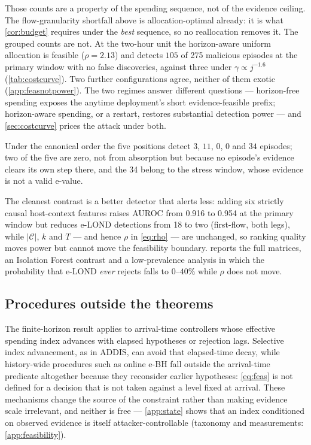 \documentclass[conference]{IEEEtran}
\newcommand{\Cal}{\mathcal{C}}
\newcommand{\nCal}{\lvert\Cal\rvert}
\begin{document}
Those counts are a property of the spending sequence, not of the evidence ceiling. The flow-granularity shortfall above is allocation-optimal already: it is what
\cref{cor:budget} requires under the \emph{best} sequence, so no reallocation removes it. The grouped
counts are not. At the two-hour unit the horizon-aware uniform allocation is feasible ($\rho=2.13$) and
detects $105$ of 275 malicious episodes at the primary window with no false discoveries, against three
under $\gamma\propto j^{-1.6}$ (\cref{tab:costcurve}). Two further configurations agree, neither of
them exotic (\cref{app:feasnotpower}). The two regimes answer different questions --- horizon-free spending exposes the
anytime deployment's short evidence-feasible prefix; horizon-aware spending, or a restart, restores
substantial detection power --- and \cref{sec:costcurve} prices the attack under both.

Under the canonical order the five positions detect $3$, $11$, $0$, $0$ and $34$ episodes; two of the five
are zero, not from absorption but because no episode's evidence clears its own step there, and the 34
belong to the stress window, whose evidence is not a valid e-value.

The cleanest contrast is a better detector that alerts less: adding six strictly causal host-context
features raises AUROC from 0.916 to 0.954 at the primary window but reduces e-LOND detections from 18 to
two (first-flow, both legs), while $\nCal$, $k$ and $T$ --- and hence $\rho$ in \eqref{eq:rho} --- are
unchanged, so ranking quality moves power but cannot move the feasibility boundary.
 reports the full matrices, an Isolation Forest contrast
and a low-prevalence analysis in which the probability that e-LOND \emph{ever} rejects falls to
$0$--$40\%$ while $\rho$ does not move.

\subsection{Procedures outside the theorems}\label{sec:escapes}

The finite-horizon result applies to arrival-time controllers whose effective spending index advances
with elapsed hypotheses or rejection lags. Selective index advancement, as in ADDIS, can avoid that
elapsed-time decay, while history-wide procedures such as online e-BH fall outside the arrival-time
predicate altogether because they reconsider earlier hypotheses: \eqref{eq:feas} is not defined for a
decision that is not taken against a level fixed at arrival. These mechanisms change the source of the
constraint rather than making evidence scale irrelevant, and neither is free ---
\cref{app:state} shows that an index conditioned on observed evidence is itself attacker-controllable
(taxonomy and measurements: \cref{app:feasibility}).
\end{document}
